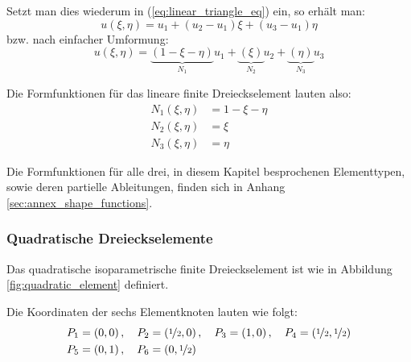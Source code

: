 Setzt man dies wiederum in (\ref{eq:linear_triangle_eq}) ein, so erhält man:
\begin{equation}
u(\xi, \eta) = u_1 + (u_2 - u_1)\xi + (u_3 - u_1)\eta
\end{equation}
bzw. nach einfacher Umformung:
\begin{equation}
u(\xi, \eta) = \underbrace{(1 - \xi - \eta)}_{N_1} u_1 + \underbrace{(\xi)}_{N_2} u_2 + \underbrace{(\eta)}_{N_3} u_3
\end{equation}

Die Formfunktionen für das lineare finite Dreieckselement lauten also:
	\begin{align}
		N_1(\xi, \eta) &= 1 - \xi - \eta \\
		N_2(\xi, \eta) &= \xi \nonumber \\
		N_3(\xi, \eta) &= \eta \nonumber
	\end{align}
	
Die Formfunktionen für alle drei, in diesem Kapitel besprochenen Elementtypen, sowie deren partielle Ableitungen, finden sich in Anhang \ref{sec:annex_shape_functions}.
	
	
	
	

\subsubsection{Quadratische Dreieckselemente}
Das quadratische isoparametrische finite Dreieckselement ist wie in Abbildung \ref{fig:quadratic_element} definiert.

Die Koordinaten der sechs Elementknoten lauten wie folgt:
\begin{align}
&P_1 = \left(0, 0 \right), \quad P_2 = \left(\nicefrac{1}{2}, 0 \right), \quad P_3 = \left(1, 0 \right), \quad P_4 = \left(\nicefrac{1}{2}, \nicefrac{1}{2} \right)\\
&P_5 = \left(0, 1 \right), \quad P_6 = \left(0, \nicefrac{1}{2} \right) \nonumber
\end{align}

